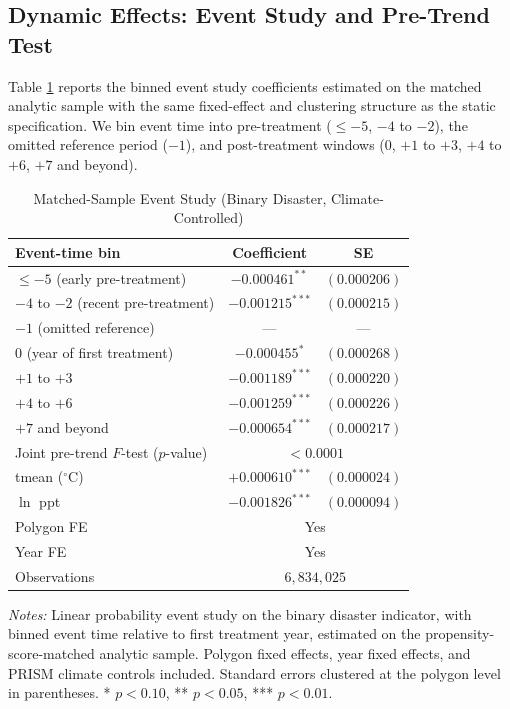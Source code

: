 \documentclass[12pt, letterpaper]{article}
\begin{document}
\subsection{Dynamic Effects: Event Study and Pre-Trend Test}

Table \ref{tab:event_study} reports the binned event study coefficients estimated on the matched analytic sample with the same fixed-effect and clustering structure as the static specification. We bin event time into pre-treatment ($\leq -5$, $-4$ to $-2$), the omitted reference period ($-1$), and post-treatment windows ($0$, $+1$ to $+3$, $+4$ to $+6$, $+7$ and beyond).

\begin{table}[H]
\centering
\small
\begin{threeparttable}
\caption{Matched-Sample Event Study (Binary Disaster, Climate-Controlled)}
\label{tab:event_study}
\begin{tabular}{lcc}
\toprule
Event-time bin & Coefficient & SE \\
\midrule
$\leq -5$ (early pre-treatment) & $-0.000461^{**}$ & $(0.000206)$ \\
$-4$ to $-2$ (recent pre-treatment) & $-0.001215^{***}$ & $(0.000215)$ \\
$-1$ (omitted reference) & --- & --- \\
$0$ (year of first treatment) & $-0.000455^{*}$ & $(0.000268)$ \\
$+1$ to $+3$ & $-0.001189^{***}$ & $(0.000220)$ \\
$+4$ to $+6$ & $-0.001259^{***}$ & $(0.000226)$ \\
$+7$ and beyond & $-0.000654^{***}$ & $(0.000217)$ \\
\midrule
Joint pre-trend $F$-test ($p$-value) & \multicolumn{2}{c}{$< 0.0001$} \\
tmean ($^\circ$C) & $+0.000610^{***}$ & $(0.000024)$ \\
$\ln$ ppt & $-0.001826^{***}$ & $(0.000094)$ \\
Polygon FE & \multicolumn{2}{c}{Yes} \\
Year FE & \multicolumn{2}{c}{Yes} \\
Observations & \multicolumn{2}{c}{$6{,}834{,}025$} \\
\bottomrule
\end{tabular}
\begin{tablenotes}
\small
\item \textit{Notes:} Linear probability event study on the binary disaster indicator, with binned event time relative to first treatment year, estimated on the propensity-score-matched analytic sample. Polygon fixed effects, year fixed effects, and PRISM climate controls included. Standard errors clustered at the polygon level in parentheses. * $p<0.10$, ** $p<0.05$, *** $p<0.01$.
\end{tablenotes}
\end{threeparttable}
\end{table}
\end{document}
